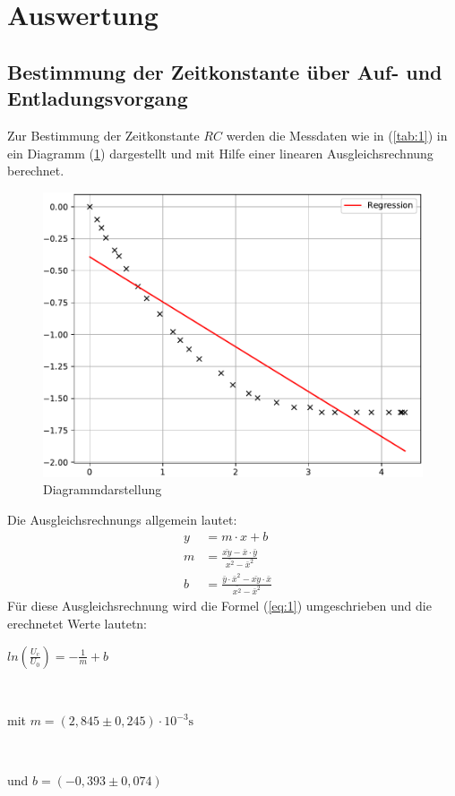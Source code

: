 

\section{Auswertung}
\subsection{Bestimmung der Zeitkonstante über Auf- und Entladungsvorgang}
Zur Bestimmung der Zeitkonstante $RC$ werden die Messdaten wie in (\ref{tab:1})
in ein Diagramm (\ref{fig:1}) dargestellt und mit Hilfe einer linearen Ausgleichsrechnung
berechnet.

\begin{figure}[H]
  \centering
  \includegraphics[width=\textwidth]{Diagramm1.pdf}
  \caption{Diagrammdarstellung}
  \label{fig:1}
\end{figure}
Die Ausgleichsrechnungs allgemein lautet:
\begin{align}
  y & = m \cdot x + b \label{eq:}\\
  m & = \frac {\bar{xy} - \bar{x} \cdot \bar{y}} {\bar{x^2} -\bar{x}^2}&  \label{eq:}\\
  b & = \frac {\bar{y} \cdot \bar{x}^2 - \bar{xy} \cdot \bar{x}} {\bar{x^2}-\bar{x}^2}& \label{eq:}
\end{align}
Für diese Ausgleichsrechnung wird die Formel (\ref{eq:1}) umgeschrieben und die erechnetet Werte lautetn: \\
\newline
\centerline{$ln(\frac{U_\text{c}}{U_\text{0}}) = -\frac{1}{m} + b$}\\
\newline
\centerline{mit $m = (2,845 \pm 0,245) \cdot 10^{-3} \si{\second}$}\\
\newline
\centerline{und $b = (-0,393 \pm 0,074)$}
\newline
